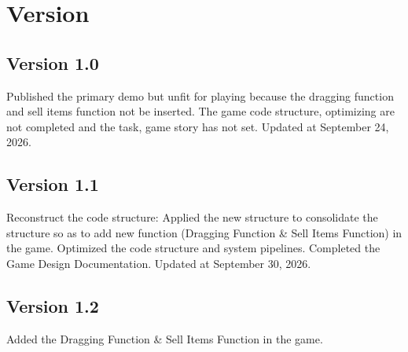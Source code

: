 \section{Version}

\subsection{Version 1.0}

Published the primary demo but unfit for playing because the dragging function and sell items function not be inserted. The game code structure, optimizing are not completed and the task, game story has not set. Updated at September 24, 2026.

\subsection{Version 1.1}

Reconstruct the code structure: Applied the new structure to consolidate the structure so as to add new function (Dragging Function \& Sell Items Function) in the game. Optimized the code structure and system pipelines. Completed the Game Design Documentation. Updated at September 30, 2026.

\subsection{Version 1.2}

Added the Dragging Function \& Sell Items Function in the game.
